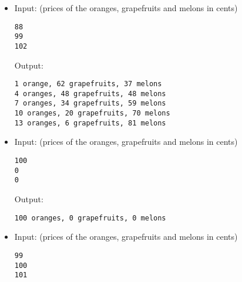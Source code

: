\documentclass[a4paper,10pt]{article}
\begin{document}
\begin{itemize}

\item Input: (prices of the oranges, grapefruits and melons in cents)
\begin{lstlisting}[style = stdio]
88
99
102
\end{lstlisting}

  Output:
\begin{lstlisting}[style = stdio]
1 orange, 62 grapefruits, 37 melons
4 oranges, 48 grapefruits, 48 melons
7 oranges, 34 grapefruits, 59 melons
10 oranges, 20 grapefruits, 70 melons
13 oranges, 6 grapefruits, 81 melons
\end{lstlisting}


\item Input: (prices of the oranges, grapefruits and melons in cents)
\begin{lstlisting}[style = stdio]
100
0
0
\end{lstlisting}

  Output:
\begin{lstlisting}[style = stdio]
100 oranges, 0 grapefruits, 0 melons
\end{lstlisting}


\item Input: (prices of the oranges, grapefruits and melons in cents)
\begin{lstlisting}[style = stdio]
99
100
101
\end{lstlisting}


\end{itemize}
\end{document}
